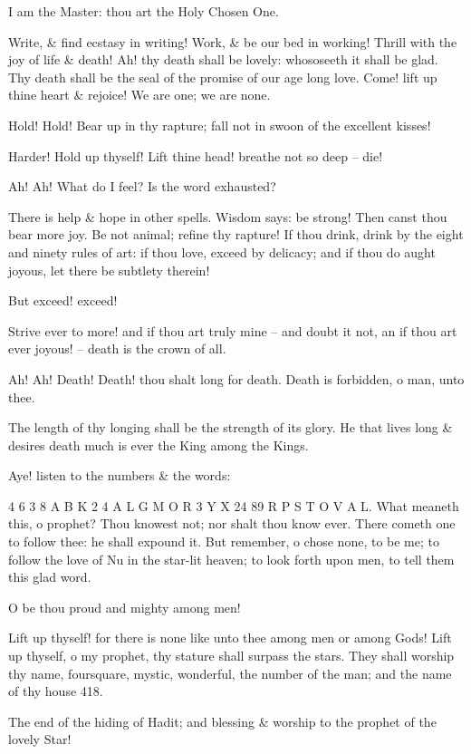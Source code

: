 I am the Master: thou art the Holy Chosen One.

Write, \& find ecstasy in writing! Work, \& be our bed in working! Thrill with the joy of life \& death! Ah! thy death shall be lovely: whososeeth it shall be glad. Thy death shall be the seal of the promise of our age long love. Come! lift up thine heart \& rejoice! We are one; we are none.

Hold! Hold! Bear up in thy rapture; fall not in swoon of the excellent kisses!

Harder! Hold up thyself! Lift thine head! breathe not so deep -- die!

Ah! Ah! What do I feel? Is the word exhausted?

There is help \& hope in other spells. Wisdom says: be strong! Then canst thou bear more joy. Be not animal; refine thy rapture! If thou drink, drink by the eight and ninety rules of art: if thou love, exceed by delicacy; and if thou do aught joyous, let there be subtlety therein!

But exceed! exceed!

Strive ever to more! and if thou art truly mine -- and doubt it not, an if thou art ever joyous! -- death is the crown of all.

Ah! Ah! Death! Death! thou shalt long for death. Death is forbidden, o man, unto thee.

The length of thy longing shall be the strength of its glory. He that lives long \& desires death much is ever the King among the Kings.

Aye! listen to the numbers \& the words:

4 6 3 8 A B K 2 4 A L G M O R 3 Y X 24 89 R P S T O V A L. What meaneth this, o prophet? Thou knowest not; nor shalt thou know ever. There cometh one to follow thee: he shall expound it. But remember, o chose none, to be me; to follow the love of Nu in the star-lit heaven; to look forth upon men, to tell them this glad word.

O be thou proud and mighty among men!

Lift up thyself! for there is none like unto thee among men or among Gods! Lift up thyself, o my prophet, thy stature shall surpass the stars. They shall worship thy name, foursquare, mystic, wonderful, the number of the man; and the name of thy house 418.

The end of the hiding of Hadit; and blessing \& worship to the prophet of the lovely Star!
